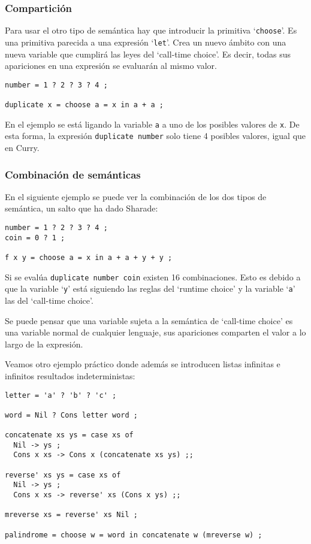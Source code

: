 \documentclass[class=article, crop=false]{standalone}
\begin{document}
\subsubsection{Compartición}

Para usar el otro tipo de semántica hay que introducir la primitiva `\verb`choose`'. Es una
primitiva parecida a una expresión `\verb`let`'. Crea un nuevo ámbito con una nueva variable
que cumplirá las leyes del `call-time choice'\cite{lopez2007simple}. Es decir, todas sus
apariciones en una expresión se evaluarán al mismo valor.

\begin{verbatim}
number = 1 ? 2 ? 3 ? 4 ;

duplicate x = choose a = x in a + a ;
\end{verbatim}

En el ejemplo se está ligando la variable \verb`a` a uno de los posibles valores de \verb`x`.
De esta forma, la expresión \verb`duplicate number` solo tiene 4 posibles valores, igual que
en Curry.

\subsubsection{Combinación de semánticas}

En el siguiente ejemplo se puede ver la combinación de los dos tipos de semántica, un salto
que ha dado Sharade:

\begin{verbatim}
number = 1 ? 2 ? 3 ? 4 ;
coin = 0 ? 1 ;

f x y = choose a = x in a + a + y + y ;
\end{verbatim}

Si se evalúa \verb`duplicate number coin` existen 16 combinaciones. Esto es debido a que la
variable `\verb`y`' está siguiendo las reglas del `runtime choice' y la variable `\verb`a`'
las del `call-time choice'.

Se puede pensar que una variable sujeta a la semántica de `call-time choice' es una variable
normal de cualquier lenguaje, sus apariciones comparten el valor a lo largo de la expresión.

Veamos otro ejemplo práctico donde además se introducen listas infinitas e infinitos
resultados indeterministas:

\begin{verbatim}
letter = 'a' ? 'b' ? 'c' ;

word = Nil ? Cons letter word ;

concatenate xs ys = case xs of
  Nil -> ys ;
  Cons x xs -> Cons x (concatenate xs ys) ;;

reverse' xs ys = case xs of
  Nil -> ys ;
  Cons x xs -> reverse' xs (Cons x ys) ;;

mreverse xs = reverse' xs Nil ;

palindrome = choose w = word in concatenate w (mreverse w) ;
\end{verbatim}
\end{document}
